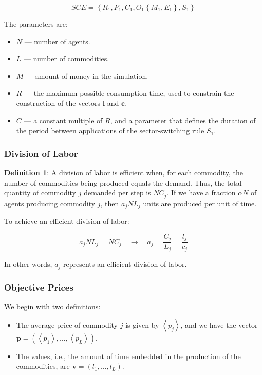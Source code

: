 $$ SCE=\left\{ R_{1},P_{1},C_{1},O_{1}\left\{ M_{1},E_{1}\right\},S_{1}\right\} $$


The parameters are:

\begin{itemize}
    \item $N$ — number of agents.  
\item $L$ — number of commodities.  
\item $M$ — amount of money in the simulation.  
\item $R$ — the maximum possible consumption time, used to constrain the construction of the vectors $\boldsymbol{l}$ and $\boldsymbol{c}$.  

\item $C$ — a constant multiple of $R$, and a parameter that defines the duration of the period between applications of the sector-switching rule $S_{1}$.

\end{itemize}

\subsubsection{Division of Labor}

\textbf{Definition 1}: A division of labor is efficient when, for each commodity,  the number of commodities being produced equals the demand.   Thus, the total quantity of commodity $j$ demanded per step is $NC_{j}$.  If we have a fraction $\alpha N$ of agents producing commodity $j$,   then $a_{j}NL_{j}$ units are produced per unit of time.  

To achieve an efficient division of labor:


\begin{equation}
a_{j}NL_{j}=NC_{j}\quad\rightarrow \quad a_{j} =\frac{C_{j}}{L_{j}}=\frac{l_{j}}{c_{j}}
\end{equation}

In other words, $a_{j}$ represents an efficient division of labor.

 
\subsubsection{ Objective Prices}

We begin with two definitions:  

\begin{itemize}
    \item The average price of commodity $j$ is given by $\left\langle p_{j}\right\rangle$,    and we have the vector $\boldsymbol{p}=\left(\left\langle p_{1}\right\rangle ,\dots,\left\langle p_{L}\right\rangle \right)$.  
\item The values, i.e., the amount of time embedded in the production of the commodities, are $\boldsymbol{v}=\left(l_{1},\dots,l_{L}\right)$.  

\end{itemize}

